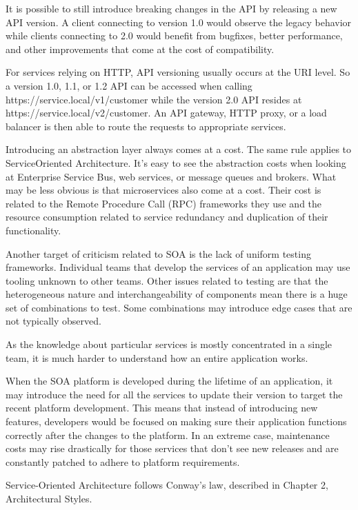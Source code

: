 It is possible to still introduce breaking changes in the API by releasing a new API version. A client connecting to version 1.0 would observe the legacy behavior while clients connecting to 2.0 would benefit from bugfixes, better performance, and other improvements that come at the cost of compatibility.

For services relying on HTTP, API versioning usually occurs at the URI level. So a version 1.0, 1.1, or 1.2 API can be accessed when calling https://service.local/v1/customer while the version 2.0 API resides at https://service.local/v2/customer. An API gateway, HTTP proxy, or a load balancer is then able to route the requests to appropriate services.


Introducing an abstraction layer always comes at a cost. The same rule applies to ServiceOriented Architecture. It's easy to see the abstraction costs when looking at Enterprise Service Bus, web services, or message queues and brokers. What may be less obvious is that microservices also come at a cost. Their cost is related to the Remote Procedure Call (RPC) frameworks they use and the resource consumption related to service redundancy and duplication of their functionality. 

Another target of criticism related to SOA is the lack of uniform testing frameworks. Individual teams that develop the services of an application may use tooling unknown to other teams. Other issues related to testing are that the heterogeneous nature and interchangeability of components mean there is a huge set of combinations to test. Some combinations may introduce edge cases that are not typically observed.

As the knowledge about particular services is mostly concentrated in a single team, it is much harder to understand how an entire application works.

When the SOA platform is developed during the lifetime of an application, it may introduce the need for all the services to update their version to target the recent platform development. This means that instead of introducing new features, developers would be focused on making sure their application functions correctly after the changes to the platform. In an extreme case, maintenance costs may rise drastically for those services that don't see new releases and are constantly patched to adhere to platform requirements.

Service-Oriented Architecture follows Conway's law, described in Chapter 2, Architectural Styles.






